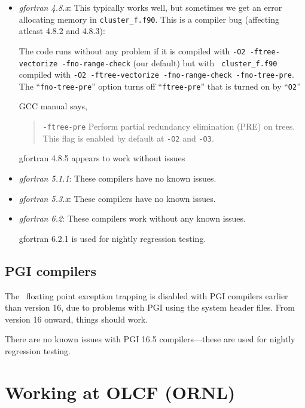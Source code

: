 \begin{itemize}

\item {\em gfortran 4.8.x}: This typically works well, but sometimes we get
an error allocating memory in {\tt cluster\_f.f90}.  This
is a compiler bug (affecting atleast 4.8.2 and 4.8.3):

The code runs without any problem if it is compiled with {\tt -O2
-ftree-vectorize -fno-range-check} (our default) but with {\tt
cluster\_f.f90} compiled with {\tt -O2 -ftree-vectorize
-fno-range-check -fno-tree-pre}.  The ``{\tt fno-tree-pre}'' option
turns off ``{\tt ftree-pre}'' that is turned on by ``{\tt O2}''
 
GCC manual says,

\begin{quote}
{\tt -ftree-pre} \newline
Perform partial redundancy elimination (PRE) on trees. This flag is enabled by default at {\tt -O2} and {\tt -O3}.
\end{quote}

gfortran 4.8.5 appears to work without issues


\item {\em gfortran 5.1.1}: These compilers have no known issues.

\item {\em gfortran 5.3.x}: These compilers have no known issues.

\item {\em gfortran 6.2}: These compilers work without any known issues.

  gfortran 6.2.1 is used for nightly regression testing.

\end{itemize}

\subsection{PGI compilers}

The \amrex\ floating point exception trapping is disabled with PGI
compilers earlier than version 16, due to problems with PGI using the
system header files.  From version 16 onward, things should work.

There are no known issues with PGI 16.5 compilers---these are used
for nightly regression testing.


\section{Working at OLCF (ORNL)}

